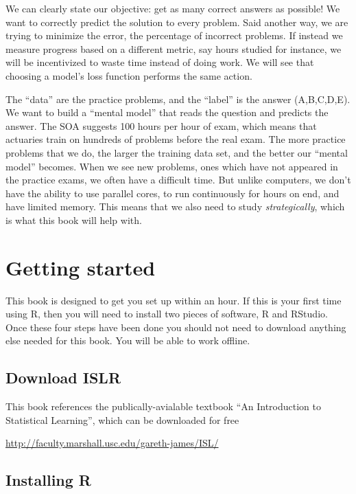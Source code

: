 \documentclass[]{book}
\begin{document}
We can clearly state our objective: get as many correct answers as possible! We want to correctly predict the solution to every problem. Said another way, we are trying to minimize the error, the percentage of incorrect problems. If instead we measure progress based on a different metric, say hours studied for instance, we will be incentivized to waste time instead of doing work. We will see that choosing a model's loss function performs the same action.

The ``data'' are the practice problems, and the ``label'' is the answer (A,B,C,D,E). We want to build a ``mental model'' that reads the question and predicts the answer. The SOA suggests 100 hours per hour of exam, which means that actuaries train on hundreds of problems before the real exam. The more practice problems that we do, the larger the training data set, and the better our ``mental model'' becomes. When we see new problems, ones which have not appeared in the practice exams, we often have a difficult time. But unlike computers, we don't have the ability to use parallel cores, to run continuously for hours on end, and have limited memory. This means that we also need to study \emph{strategically}, which is what this book will help with.

\hypertarget{getting-started}{%
\chapter{Getting started}\label{getting-started}}

This book is designed to get you set up within an hour. If this is your first time using R, then you will need to install two pieces of software, R and RStudio. Once these four steps have been done you should not need to download anything else needed for this book. You will be able to work offline.

\hypertarget{download-islr}{%
\section{Download ISLR}\label{download-islr}}

This book references the publically-avialable textbook ``An Introduction to Statistical Learning'', which can be downloaded for free

\url{http://faculty.marshall.usc.edu/gareth-james/ISL/}

\hypertarget{installing-r}{%
\section{Installing R}\label{installing-r}}
\end{document}

